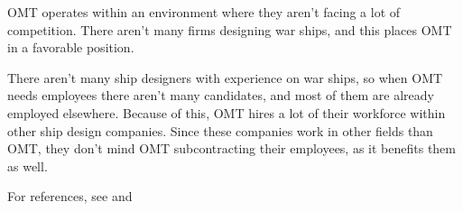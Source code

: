 \label{app:OMT_environment}
OMT operates within an environment where they aren't facing a lot of competition. 
There aren't many firms designing war ships, and this places OMT in a favorable position.

There aren't many ship designers with experience on war ships, so when OMT needs employees there aren't many candidates, and most of them are already employed elsewhere.
Because of this, OMT hires a lot of their workforce within other ship design companies.
Since these companies work in other fields than OMT, they don't mind OMT subcontracting their employees, as it benefits them as well. 

For references, see  and 